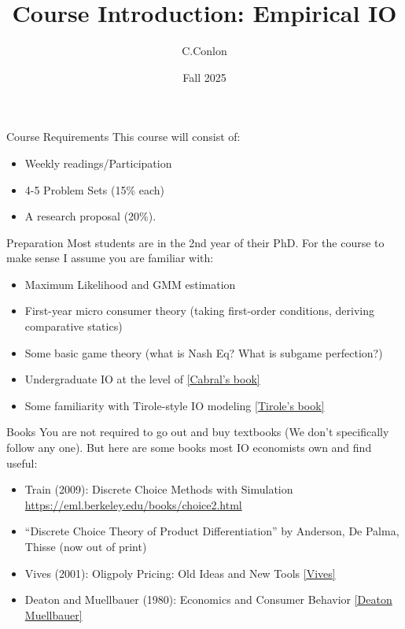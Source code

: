 \documentclass[aspectratio=169,11pt]{beamer}
\title [Course Intro]{Course Introduction: Empirical IO}
\author{C.Conlon}
\institute{Grad IO }
\date{Fall 2025}
\begin{document}
\begin{frame}
\titlepage
\end{frame}

\begin{frame}{Course Requirements}
This course will consist of:
\begin{itemize}
    \item Weekly readings/Participation
    \item 4-5 Problem Sets (15\% each)
    \item A research proposal (20\%).
\end{itemize}
\end{frame}


\begin{frame}{Preparation}
Most students are in the 2nd year of their PhD. For the course to make sense I assume you are familiar with:
\begin{itemize}
    \item Maximum Likelihood and GMM estimation
    \item First-year micro consumer theory (taking first-order conditions, deriving comparative statics)
    \item Some basic game theory (what is Nash Eq? What is subgame perfection?)
    \item Undergraduate IO at the level of \href{https://www.amazon.com/Introduction-Industrial-Organization-MIT-Press/dp/0262035944}{[Cabral's book]}
    \item Some familiarity with Tirole-style IO modeling \href{https://www.amazon.com/Theory-Industrial-Organization-MIT-Press/dp/0262200716/}{[Tirole's book]}
\end{itemize}
\end{frame}



\begin{frame}{Books}
You are not required to go out and buy textbooks (We don't specifically follow any one). But here are some books most IO economists own and find useful:
\begin{itemize}
    \item Train (2009): Discrete Choice Methods with Simulation \url{https://eml.berkeley.edu/books/choice2.html}
    \item ``Discrete Choice Theory of Product Differentiation'' by Anderson, De Palma, Thisse (now out of print)
    \item Vives (2001): Oligpoly Pricing: Old Ideas and New Tools \href{https://www.amazon.com/Oligopoly-Pricing-Old-Ideas-Tools/dp/026272040X}{[Vives]}
    \item Deaton and Muellbauer (1980): Economics and Consumer Behavior \href{https://www.amazon.com/Economics-Consumer-Behavior-Angus-Deaton/dp/0521296765}{[Deaton Muellbauer]}
\end{itemize}
\end{frame}
\end{document}

